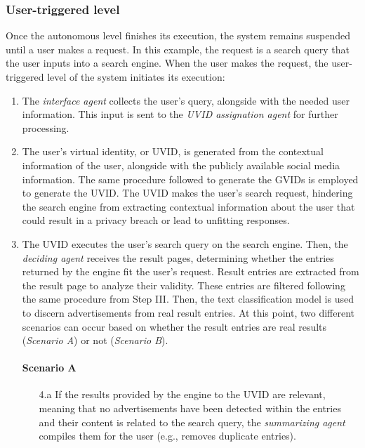 \subsubsection*{User-triggered level}
Once the autonomous level finishes its execution, the system remains suspended until a user makes a request. In this example, the request is a search query that the user inputs into a search engine. When the user makes the request, the user-triggered level of the system initiates its execution:
\begin{enumerate}
    \item The \textit{interface agent} collects the user's query, alongside with the needed user information. This input is sent to the \textit{UVID assignation agent} for further processing.
    
    \item The user's virtual identity, or UVID, is generated from the contextual information of the user, alongside with the publicly available social media information. The same procedure followed to generate the GVIDs is employed to generate the UVID. The UVID makes the user's search request, hindering the search engine from extracting contextual information about the user that could result in a privacy breach or lead to unfitting responses.
    
    \item The UVID executes the user's search query on the search engine. Then, the \textit{deciding agent} receives the result pages, determining whether the entries returned by the engine fit the user's request. Result entries are extracted from the result page to analyze their validity. These entries are filtered following the same procedure from Step III. Then, the text classification model is used to discern advertisements from real result entries. At this point, two different scenarios can occur based on whether the result entries are real results (\textit{Scenario A}) or not (\textit{Scenario B}). 
    
    \paragraph{Scenario A}
    \begin{enumerate}
        \item [4.a] If the results provided by the engine to the UVID are relevant, meaning that no advertisements have been detected within the entries and their content is related to the search query, the \textit{summarizing agent} compiles them for the user (e.g., removes duplicate entries).
        

\end{enumerate}
\end{enumerate}
